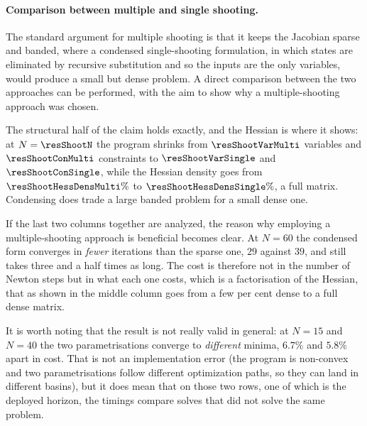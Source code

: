 \documentclass[11pt,a4paper]{article}
\begin{document}
\paragraph{Comparison between multiple and single shooting.} The standard argument for multiple shooting is that
it keeps the Jacobian sparse and banded, where a condensed single-shooting formulation, in which states are eliminated
by recursive substitution and so the inputs are the only variables, would produce a small but dense problem. A direct comparison between the two approaches can be performed, with the aim to show why a multiple-shooting approach was chosen. 

\begin{table}[htbp]
  \centering
  \small
  \caption{%
  Multiple (M) against single (S) shooting on the same instance, at the deployed profile. Dimensions,
  densities and iteration counts are exact; each timing is the fastest of three cold solves, with no warm
  start. The table shows the comparison for the number of variables, number of constraints, the Hessian density, the number of iterations and the solve time needed by each method for different lengths of the prediction horizon $N$.}
  \label{res:tab:shoot}
\end{table}

The structural half of the claim holds exactly, and the Hessian is where it shows: at $N=\resShootN$ the
program shrinks from $\resShootVarMulti$ variables and $\resShootConMulti$ constraints to
$\resShootVarSingle$ and $\resShootConSingle$, while the Hessian density goes from
$\resShootHessDensMulti\%$ to $\resShootHessDensSingle\%$, a full matrix. Condensing does trade a large
banded problem for a small dense one.

If the last two columns together are analyzed, the reason why employing a multiple-shooting approach is beneficial becomes clear. At $N=60$ the condensed form converges in \emph{fewer} iterations than
the sparse one, $29$ against $39$, and still takes three and a half times as long. The cost is therefore not
in the number of Newton steps but in what each one costs, which is a factorisation of the Hessian, that as shown in the middle column goes from a few per cent dense to a full dense matrix.

It is worth noting that the result is not really valid in general: at $N=15$ and $N=40$ the two parametrisations
converge to \emph{different} minima, $6.7\%$ and $5.8\%$ apart in cost. That is not an implementation
error (the program is non-convex and two parametrisations follow different optimization paths, so they can
land in different basins), but it does mean that on those two rows, one of which is the deployed horizon,
the timings compare solves that did not solve the same problem.
\end{document}
